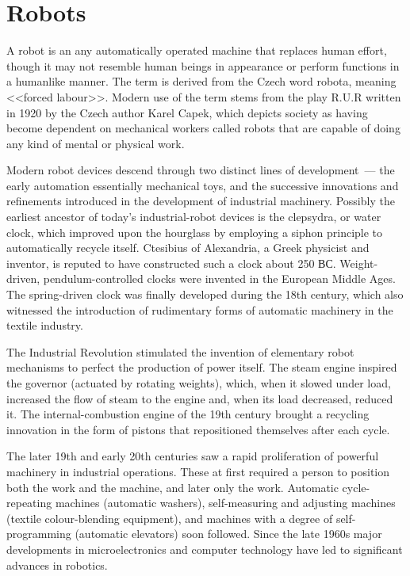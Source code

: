 \documentclass[a4paper]{article}
\begin{document}
\section{Robots}

A robot is an any automatically operated machine that replaces human effort,
though it may not resemble human beings in appearance or perform functions in a
humanlike manner. The term is derived from the Czech word robota, meaning
<<forced labour>>. Modern use of the term stems from the play R.U.R written in 1920
by the Czech author Karel Capek, which depicts society as having become
dependent on mechanical workers called robots that are capable of doing any kind
of mental or physical work.

Modern robot devices descend
through two distinct lines of development~--- the early automation
essentially mechanical toys, and the successive innovations and refinements
introduced in the development of industrial machinery. Possibly the earliest
ancestor of today's industrial-robot devices is the clepsydra, or water clock,
which improved upon the hourglass by employing a siphon principle to
automatically recycle itself. Ctesibius of Alexandria, a Greek physicist and
inventor, is reputed to have constructed such a clock about 250 ВС. Weight-
driven, pendulum-controlled clocks were invented in the European Middle Ages.
The spring-driven clock was finally developed during the 18th century, which
also witnessed the introduction of rudimentary forms of automatic machinery in
the textile industry.

The Industrial Revolution stimulated the invention of
elementary robot mechanisms to perfect the production of power itself. The steam
engine inspired the governor (actuated by rotating weights), which, when it
slowed under load, increased the flow of steam to the engine and, when its load
decreased, reduced it. The internal-combustion engine of the 19th century
brought a recycling innovation in the form of pistons that repositioned
themselves after each cycle.

The later 19th and early 20th centuries saw a rapid
proliferation of powerful machinery in industrial operations. These at first
required a person to position both the work and the machine, and later only the
work. Automatic cycle-repeating machines (automatic washers), self-measuring and
adjusting machines (textile colour-blending equipment), and machines with a
degree of self-programming (automatic elevators) soon followed. Since the late
1960s major developments in microelectronics and computer technology have led to
significant advances in robotics.
\end{document}
